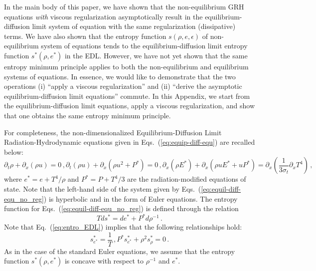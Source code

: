 \documentclass[review]{elsarticle}
\newcommand{\eqt}[1]{Eq.~(\ref{#1})}                     %
\newcommand{\eqts}[1]{Eqs.~(\ref{#1})}                     %
\newcommand{\tcr}[1]{\textcolor{red}{#1}}
\begin{document}
\begin{appendices}
In the main body of this paper, we have shown that the non-equilibrium GRH equations \emph{with} viscous regularization asymptotically result in the equilibrium-diffusion limit system of equation with the same regularization (dissipative) terms. We have also shown that the entropy function $s(\rho, e, \epsilon)$ of non-equilibrium system of equations tends to the equilibrium-diffusion limit entropy function $s^*(\rho, e^*)$ in the EDL. However, we have not yet shown that the same entropy minimum principle applies to both the non-equilibrium and equilibrium systems of equations. In essence, we would like to demonstrate that the two operations (i) ``apply a viscous regularization'' and (ii) ``derive the asymptotic equilibrium-diffusion limit equations'' commute. In this Appendix, we start from the equilibrium-diffusion limit equations, apply a viscous regularization, and show that one obtains the same entropy minimum principle. 

For completeness, the non-dimensionalized Equilibrium-Diffusion Limit Radiation-Hydrodynamic equations given in \eqts{eq:equip-diff-equ} are recalled below:
%
\begin{subequations}
\label{eq:equil-diff-equ_no_reg}
%
\begin{equation}
\partial_t \rho + \partial_x \left( \rho u \right) = 0  \, ,
\end{equation}
%
\begin{equation}
\partial_t \left( \rho u \right) + \partial_x \left( \rho u^2 + P^* \right) = 0 \, , 
\end{equation}
%
\begin{equation}
\partial_x \left( \rho E^* \right) + \partial_x \left( \rho u E^* + u P^* \right) = \partial_x \left( \frac{1}{3 \sigma_t} \partial_x T^4 \right) \, ,
\end{equation}
%
\end{subequations}
%
where $e^* = e + T^4/\rho$ and $P^* = P + T^4/3$ are the radiation-modified equations of state. 
Note that the left-hand side of the system given by \eqts{eq:equil-diff-equ_no_reg} is hyperbolic 
and in the form of Euler equations. The entropy function for \eqts{eq:equil-diff-equ_no_reg} is defined 
through the relation
\begin{equation}
\label{eq:entro_EDL}
T d s^* = d e^* + P^* d \rho^{-1} \,.
\end{equation}
Note that \eqt{eq:entro_EDL} implies that the following relationships hold:
%
\begin{subequations}
\begin{equation}
s^*_{e^*} = \frac 1 T \,,
\end{equation}
\begin{equation} \label{eq:secondlawTD}
P^* s^*_{e^*} + \rho^2 s^*_{\rho} = 0 \,.
\end{equation}
\end{subequations}
As in the case of the standard Euler equations, we assume that the entropy function $s^*(\rho,e^*)$ is concave 
with respect to $\rho^{-1}$ and $e^*$.


\end{appendices}
\end{document}
